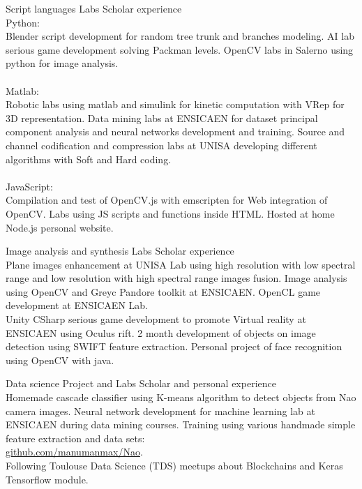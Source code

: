 \documentclass{tccv-master/tccv}
\begin{document}
\begin{eventlist}
\item{Script languages}
{Labs}
{Scholar experience}\\
Python: \\
Blender script development for random tree trunk and branches modeling. 
AI lab serious game development solving Packman levels.
OpenCV labs in Salerno using python for image analysis.\\\\
Matlab:\\
Robotic labs using matlab and simulink for kinetic computation with VRep for 3D representation.
Data mining labs at ENSICAEN for dataset principal component analysis and neural networks development and training.
Source and channel codification and compression labs at UNISA developing different algorithms with Soft and Hard coding.\\\\
JavaScript:\\
Compilation and test of OpenCV.js with emscripten for Web integration of OpenCV.
Labs using JS scripts and functions inside HTML.
Hosted at home Node.js personal website.

\item
{Image analysis and synthesis}
{Labs}
{Scholar experience}\\
Plane images enhancement at UNISA Lab using high resolution with low spectral range and low resolution with high spectral range images fusion.
Image analysis using OpenCV and Greyc Pandore toolkit at ENSICAEN.
OpenCL game development at ENSICAEN Lab.\\
Unity CSharp serious game development to promote Virtual reality at ENSICAEN using Oculus rift. 2 month development of objects on image detection using SWIFT feature extraction.
Personal project of face recognition using OpenCV with java.

\item
{Data science}
{Project and Labs}
{Scholar and personal experience}\\
Homemade cascade classifier using K-means algorithm to detect objects from Nao camera images.
Neural network development for machine learning lab at ENSICAEN during data mining courses.
Training using various handmade simple feature extraction and data sets:\\
\href{https://github.com/manumanmax/Nao}{github.com/manumanmax/Nao}.\\
Following Toulouse Data Science (TDS) meetups about Blockchains and Keras Tensorflow module.


\end{eventlist}
\end{document}
